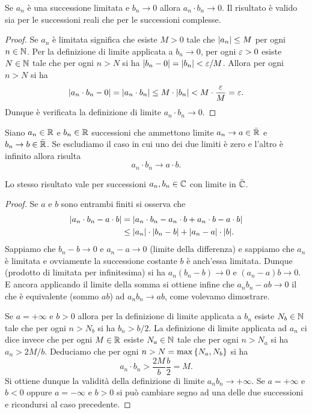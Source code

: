 \begin{theorem}
\mymark{**}
Se $a_n$ è una successione limitata e $b_n\to 0$ allora
$a_n\cdot b_n \to 0$.
Il risultato è valido sia per le successioni reali
che per le successioni complesse.
\end{theorem}
%
\begin{proof}
  Se $a_n$ è limitata significa che esiste $M>0$ tale che ${\left|a_n\right|}\le M$ per
  ogni $n\in \mathbb N$.
  Per la definizione di limite applicata a $b_n\to 0$, per ogni $\varepsilon>0$
  esiste $N\in \mathbb N$ tale che per ogni $n>N$ si ha ${\left|b_n -0\right|}={\left|b_n\right|} < \varepsilon / M$.
  Allora per ogni $n>N$ si ha
  \[
    {\left|a_n\cdot b_n - 0\right|} = {\left|a_n\cdot b_n\right|} \le M \cdot {\left|b_n\right|}
    < M \cdot \frac {\varepsilon} M = \varepsilon.
  \]
  Dunque è verificata la definizione di limite $a_n \cdot b_n \to 0$.
\end{proof}
\begin{theorem}
\label{th:limite_prodotto}
\mymark{***}
Siano $a_n\in \mathbb R$ e $b_n\in \mathbb R$ successioni
che ammettono limite $a_n \to a\in \bar {\mathbb R}$ e $b_n \to b\in \bar {\mathbb R}$.
Se escludiamo il caso in cui uno dei due limiti
è zero e l'altro è infinito
allora risulta
\[
  a_n \cdot b_n \to a\cdot b.
\]

Lo stesso risultato vale per successioni $a_n,b_n\in \mathbb C$ con limite in $\bar {\mathbb C}$.
\end{theorem}
\begin{proof}
\mymark{**}
Se $a$ e $b$ sono entrambi finiti si osserva che
\begin{align*}
  {\left|a_n \cdot b_n - a\cdot b\right|}
  &= {\left|a_n \cdot b_n - a_n \cdot b + a_n \cdot b - a\cdot b\right|}\\
  &\le {\left|a_n\right|} \cdot{\left|b_n - b\right|} + {\left|a_n -a\right|} \cdot {\left|b\right|}.
\end{align*}
Sappiamo che $b_n - b \to 0$ e $a_n - a \to 0$ (limite della differenza)
e sappiamo che $a_n$ è limitata e ovviamente la successione costante $b$ è anch'essa limitata.
Dunque (prodotto di limitata per infinitesima) si ha $a_n(b_n-b)\to 0$ e $(a_n-a)b\to 0$. E ancora applicando il limite della somma si ottiene
infine che $a_n b_n - ab\to 0$ il che è equivalente (sommo $ab$) ad $a_n b_n\to ab$, come volevamo dimostrare.

Se $a = +\infty$ e $b>0$ allora per la definizione di limite applicata a $b_n$
esiste $N_b\in \mathbb N$ tale che per ogni $n>N_b$ si ha $b_n > b/2$. La definizione
di limite applicata ad $a_n$ ci dice invece che per ogni $M\in \mathbb R$
esiste $N_a\in \mathbb N$ tale che per ogni $n>N_a$ si ha $a_n > 2M/b$.
Deduciamo che per ogni $n> N=\max{\left\{ N_a, N_b \right\}}$ si ha
\[
  a_n\cdot b_n > \frac{2M}{b}\frac{b}{2} = M.
\]
Si ottiene dunque la validità della definizione di limite $a_n b_n\to +\infty$.
Se $a= +\infty$ e $b<0$ oppure $a=-\infty$ e $b>0$ si può cambiare segno
ad una delle due successioni e ricondursi al caso precedente.
\end{proof}

